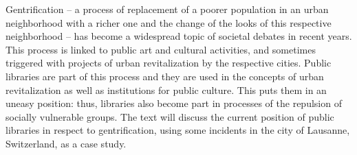 Gentrification -- a process of replacement of a poorer population in an
urban neighborhood with a richer one and the change of the looks of this
respective neighborhood -- has become a widespread topic of societal
debates in recent years. This process is linked to public art and
cultural activities, and sometimes triggered with projects of urban
revitalization by the respective cities. Public libraries are part of
this process and they are used in the concepts of urban revitalization
as well as institutions for public culture. This puts them in an uneasy
position: thus, libraries also become part in processes of the repulsion
of socially vulnerable groups. The text will discuss the current
position of public libraries in respect to gentrification, using some
incidents in the city of Lausanne, Switzerland, as a case study.
